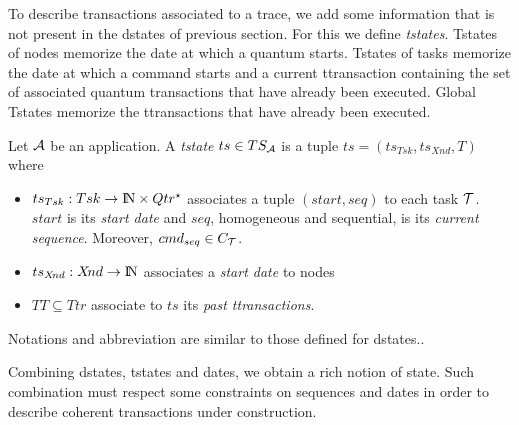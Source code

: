 \documentclass{article}
\newcommand{\NAT}{\mbox{\normalfont I$\!$N}}
\begin{document}
To describe transactions associated to a trace, we add some information that is not present in the dstates of previous section. For this we define {\em tstates}. Tstates of nodes memorize the date at which a quantum starts. Tstates of tasks memorize the date at which a command starts and a current ttransaction containing the set of associated quantum transactions that have already been executed. Global Tstates memorize the ttransactions that have already been executed.
\begin{definition}[tstates]\label{def-tst} Let ${\cal A}$ be an application. A {\em tstate} $ts\in TS_{\cal A}$ is a tuple $ts=(ts_{Tsk},ts_{X\!nd},T)$ where
\begin{itemize}
\item $ts_{Tsk}: Tsk\rightarrow \NAT\times Qtr^{\star}$ associates a tuple $(start,seq)$ to each task ${\cal T}$. $start$ is its {\em start date} and $seq$, homogeneous and sequential, is its {\em current sequence}.
Moreover, $cmd_{seq}\in C_{\cal T}$.
\item $ts_{X\!nd}: X\!nd\rightarrow \NAT$ associates a {\em start date} to nodes 
\item $TT\subseteq Ttr$ associate to $ts$ its {\em past ttransactions}.
\end{itemize}
Notations and abbreviation are similar to those defined for dstates..
\end{definition}
Combining dstates, tstates and dates, we obtain a rich notion of state. Such combination must respect some constraints on sequences and dates in order to describe coherent transactions under construction.
\end{document}
